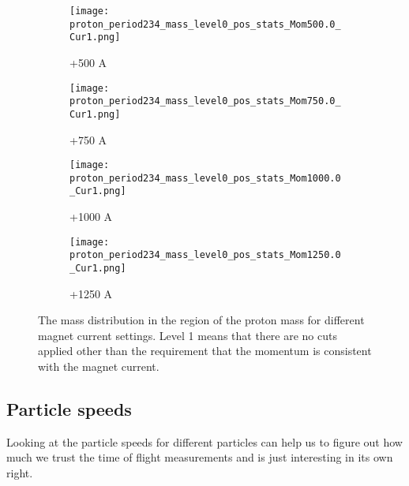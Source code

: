 \begin{figure}[h]
             \begin{subfigure}[b]{0.24\textwidth}
            \centering
            \texttt{[image: proton\_period234\_mass\_level0\_pos\_stats\_Mom500.0\_Cur1.png]}
            \caption{+500 A}
            \label{fig_mproton500}
            \end{subfigure}
             \hfill   
            \begin{subfigure}[b]{0.24\textwidth}
            \centering
            \texttt{[image: proton\_period234\_mass\_level0\_pos\_stats\_Mom750.0\_Cur1.png]}
            \caption{+750 A}
            \label{fig_mproton750}
            \end{subfigure}
             \hfill   
            \begin{subfigure}[b]{0.24\textwidth}
            \centering
            \texttt{[image: proton\_period234\_mass\_level0\_pos\_stats\_Mom1000.0\_Cur1.png]}
            \caption{+1000 A}
            \label{fig_mproton1000}
            \end{subfigure}
             \hfill                             
             \begin{subfigure}[b]{0.24\textwidth}
            \centering
            \texttt{[image: proton\_period234\_mass\_level0\_pos\_stats\_Mom1250.0\_Cur1.png]}
            \caption{+1250 A}
            \label{fig_mproton+1250}
            \end{subfigure}

            
\caption{The mass distribution in the region of the proton mass for different magnet current settings. Level 1 means that there are no cuts applied other than the requirement that the momentum is consistent with the magnet current.} 
\label{fig_protonmass}
  \end{figure}
  
  \newpage
  
  \subsection{Particle speeds}
  
  Looking at the particle speeds for different particles can help us to figure out how much we trust the time of flight measurements and is just interesting in its own right.
  
